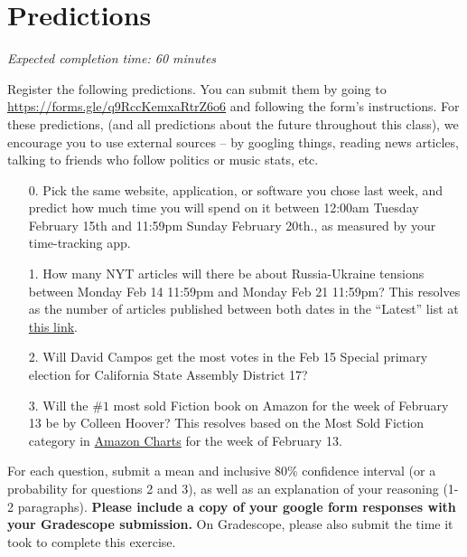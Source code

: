 \documentclass[11pt]{article}
\begin{document}
\section*{Predictions}

\emph{Expected completion time: 60 minutes}

Register the following predictions. You can submit them by going to \url{https://forms.gle/q9RccKemxaRtrZ6o6} and following the form's instructions. For these predictions, (and all predictions about the future throughout this class), we encourage you to use external sources -- by googling things, reading news articles, talking to friends who follow politics or music stats, etc.

\begin{enumerate}
	\item[0.] Pick the same website, application, or software you chose last week, and predict how much time you will spend on it between 12:00am Tuesday February 15th and 11:59pm Sunday February 20th., as measured by your time-tracking app.

	\item[1.] How many NYT articles will there be about Russia-Ukraine tensions between Monday Feb 14 11:59pm and Monday Feb 21 11:59pm? This resolves as the number of articles published between both dates in the ``Latest'' list at \href{https://www.nytimes.com/news-event/ukraine-russia?name=styln-russia-ukraine&region=TOP_BANNER&block=storyline_menu_recirc&action=click&pgtype=LegacyCollection&variant=0_Control}{this link}.

	\item[2.] Will David Campos get the most votes in the Feb 15 Special primary election for California State Assembly District 17?

	\item[3.] Will the $\#1$ most sold Fiction book on Amazon for the week of February 13 be by Colleen Hoover? This resolves based on the Most Sold Fiction category in \href{https://www.amazon.com/charts/}{Amazon Charts} for the week of February 13.
\end{enumerate}

For each question, submit a mean and inclusive 80\% confidence interval (or a probability for questions 2 and 3), as well as an explanation of your reasoning (1-2 paragraphs). \textbf{Please include a copy of your google form responses with your Gradescope submission.} On Gradescope, please also submit the time it took to complete this exercise.
\end{document}
